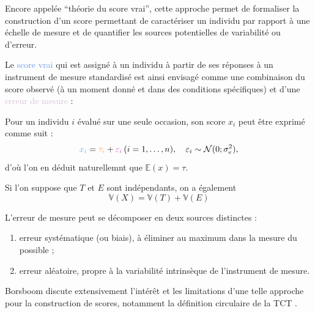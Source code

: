 

Encore appelée \enquote{théorie du score vrai}, cette approche permet de
formaliser la construction d'un score permettant de caractériser un individu par
rapport à une échelle de mesure et de quantifier les sources potentielles de
variabilité ou d'erreur.

Le \textcolor{CornflowerBlue}{score vrai} qui est assigné à un individu à partir
de ses réponses à un instrument de mesure standardisé est ainsi envisagé comme
une combinaison du \textcolor{Apricot}{score observé} (à un moment donné et dans
des conditions spécifiques) et d'une \textcolor{Thistle}{erreur de mesure} :




Pour un individu $i$ évalué sur une seule occasion, son score $x_i$ peut être
exprimé comme suit : 
\[
\textcolor{CornflowerBlue}{x_i} = \textcolor{Apricot}{\tau_i} +
\textcolor{Thistle}{\varepsilon_i}\, (i=1,\dots,n),\quad \varepsilon_i\sim\mathcal{N}(0;\sigma_e^2),
\]
d'où l'on en déduit naturellemnt que $\mathbb{E}(x)=\tau$.

Si l'on suppose que $T$ et $E$ sont indépendants, on a également
\[
\mathbb{V}(X) = \mathbb{V}(T)+\mathbb{V}(E)
\]





L'erreur de mesure peut se décomposer en deux sources distinctes :
\begin{enumerate}
\item erreur systématique (ou biais), à éliminer au maximum dans la mesure du
  possible ; 
\item erreur aléatoire, propre à la variabilité intrinsèque de l'instrument de
  mesure. 
\end{enumerate}

Borsboom discute extensivement l'intérêt et les limitations d'une telle approche
pour la construction de scores, notamment la définition circulaire de la TCT \autocite{Borsboom2006,Borsboom2005}.

